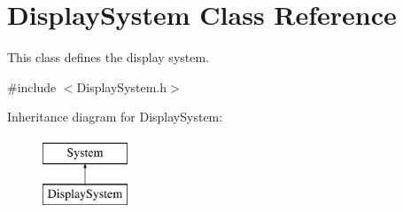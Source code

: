 \hypertarget{class_display_system}{}\section{Display\+System Class Reference}
\label{class_display_system}


This class defines the display system.  




{\ttfamily \#include $<$Display\+System.\+h$>$}

Inheritance diagram for Display\+System\+:\begin{figure}[H]
\begin{center}
\leavevmode
\includegraphics[height=2.000000cm]{class_display_system}
\end{center}
\end{figure}

